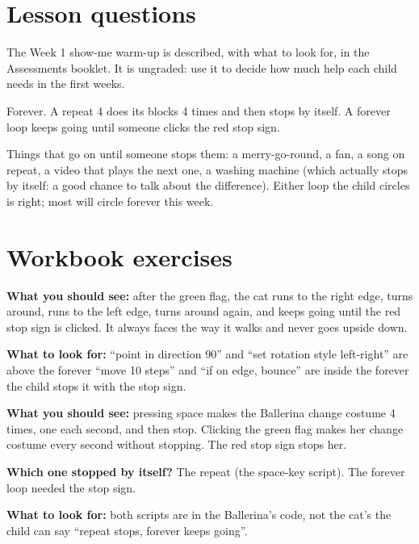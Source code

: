 
\section{Lesson questions}
\begin{answer}
The Week 1 show-me warm-up is described, with what to look for, in the Assessments booklet. It is ungraded: use it to decide how much help each child needs in the first weeks.
\end{answer}

\begin{answer}
Forever. A repeat 4 does its blocks 4 times and then stops by itself. A forever loop keeps going until someone clicks the red stop sign.
\end{answer}

\begin{answer}[Reflection]
Things that go on until someone stops them: a merry-go-round, a fan, a song on repeat, a video that plays the next one, a washing machine (which actually stops by itself: a good chance to talk about the difference). Either loop the child circles is right; most will circle forever this week.
\end{answer}

\section{Workbook exercises}
\begin{answer}
\textbf{What you should see:} after the green flag, the cat runs to the right edge, turns around, runs to the left edge, turns around again, and keeps going until the red stop sign is clicked. It always faces the way it walks and never goes upside down.

\textbf{What to look for:} \tickbox{} \enquote{point in direction 90} and \enquote{set rotation style left-right} are above the forever \quad \tickbox{} \enquote{move 10 steps} and \enquote{if on edge, bounce} are inside the forever \quad \tickbox{} the child stops it with the stop sign.
\end{answer}

\begin{answer}
\textbf{What you should see:} pressing space makes the Ballerina change costume 4 times, one each second, and then stop. Clicking the green flag makes her change costume every second without stopping. The red stop sign stops her.

\textbf{Which one stopped by itself?} The repeat (the space-key script). The forever loop needed the stop sign.

\textbf{What to look for:} \tickbox{} both scripts are in the Ballerina's code, not the cat's \quad \tickbox{} the child can say \enquote{repeat stops, forever keeps going}.
\end{answer}

